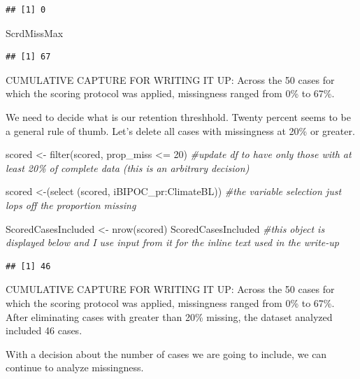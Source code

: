 \documentclass[
  11pt,
]{book}
\newenvironment{Shaded}{\begin{snugshade}}{\end{snugshade}}
\newcommand{\CommentTok}[1]{\textcolor[rgb]{0.56,0.35,0.01}{\textit{#1}}}
\newcommand{\DecValTok}[1]{\textcolor[rgb]{0.00,0.00,0.81}{#1}}
\newcommand{\FunctionTok}[1]{\textcolor[rgb]{0.00,0.00,0.00}{#1}}
\newcommand{\NormalTok}[1]{#1}
\newcommand{\OtherTok}[1]{\textcolor[rgb]{0.56,0.35,0.01}{#1}}
\newcommand{\SpecialCharTok}[1]{\textcolor[rgb]{0.00,0.00,0.00}{#1}}
\begin{document}
\begin{verbatim}
## [1] 0
\end{verbatim}

\begin{Shaded}
\begin{Highlighting}[]
\NormalTok{ScrdMissMax}
\end{Highlighting}
\end{Shaded}

\begin{verbatim}
## [1] 67
\end{verbatim}

CUMULATIVE CAPTURE FOR WRITING IT UP: Across the 50 cases for which the scoring protocol was applied, missingness ranged from 0\% to 67\%.

We need to decide what is our retention threshhold. Twenty percent seems to be a general rule of thumb. Let's delete all cases with missingness at 20\% or greater.

\begin{Shaded}
\begin{Highlighting}[]
\NormalTok{scored }\OtherTok{\textless{}{-}} \FunctionTok{filter}\NormalTok{(scored, prop\_miss }\SpecialCharTok{\textless{}=} \DecValTok{20}\NormalTok{)  }\CommentTok{\#update df to have only those with at least 20\% of complete data (this is an arbitrary decision)}

\NormalTok{scored }\OtherTok{\textless{}{-}}\NormalTok{(}\FunctionTok{select}\NormalTok{ (scored, iBIPOC\_pr}\SpecialCharTok{:}\NormalTok{ClimateBL)) }\CommentTok{\#the variable selection just lops off the proportion missing}

\NormalTok{ScoredCasesIncluded }\OtherTok{\textless{}{-}} \FunctionTok{nrow}\NormalTok{(scored)}
\NormalTok{ScoredCasesIncluded }\CommentTok{\#this object is displayed below and I use input from  it for the inline text used in the write{-}up}
\end{Highlighting}
\end{Shaded}

\begin{verbatim}
## [1] 46
\end{verbatim}

CUMULATIVE CAPTURE FOR WRITING IT UP: Across the 50 cases for which the scoring protocol was applied, missingness ranged from 0\% to 67\%. After eliminating cases with greater than 20\% missing, the dataset analyzed included 46 cases.

With a decision about the number of cases we are going to include, we can continue to analyze missingness.
\end{document}
